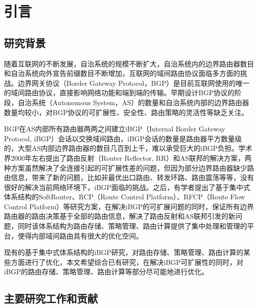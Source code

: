 \chapter{引言}
\label{cha:intro}


\section{研究背景}

随着互联网的不断发展，自治系统的规模不断扩大，自治系统内的边界路由器数目和自治系统向外宣告前缀数目不断增加，互联网的域间路由协议面临多方面的挑战。边界网关协议（Border Gateway Protocol，BGP）是目前互联网使用的唯一的域间路由协议，直接影响网络功能和端到端的传输。早期设计BGP协议的阶段，自治系统（Autonomous System，AS）的数量和自治系统内部的边界路由器数量均较小，对BGP协议的可扩展性、安全性、路由策略的灵活性等缺乏关注。

BGP在AS内部所有路由器两两之间建立iBGP（Internal Border Gateway Protocol, iBGP）会话以交换域间路由，iBGP会话的数量是路由器平方数量级的，大型AS内部边界路由器的数目几百到上千，难以承受巨大的iBGP负担。学术界2000年左右提出了路由反射（Router Reflector, RR）和AS联邦的解决方案，两种方案虽然解决了全连接引起的可扩展性差的问题，但因为部分边界路由器缺少路由信息，带来了新的问题，比如非最优出口路由、转发环路、路由震荡等等，没有很好的解决当前网络环境下，iBGP面临的挑战。之后，有学者提出了基于集中式体系结构的SoftRouter、RCP（Route Control Platform）、RFCP（Route Flow Control Platform）等研究方案，在解决iBGP的可扩展问题的同时，保证所有边界路由器的路由决策基于全部的路由信息，解决了路由反射和AS联邦引发的新问题，同时该体系结构为路由存储、策略管理、路由计算提供了集中处理和管理的平台，使得内部域间路由具有很大的优化空间。

现有的基于集中式体系结构的iBGP研究，对路由存储、策略管理、路由计算的某些方面进行了优化，本文希望综合已有研究，在解决iBGP可扩展性的同时，对iBGP的路由存储、策略管理、路由计算等部分尽可能地进行优化。

\section{主要研究工作和贡献}


